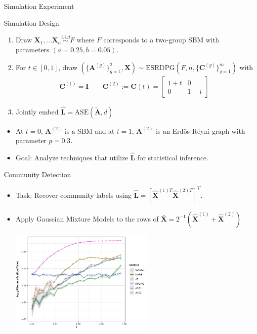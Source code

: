 \documentclass[handout]{beamer}
\newcommand{\bvar}[1]{\mathbf{#1}}
\begin{document}
\begin{frame}{Simulation Experiment}

    \begin{block}{Simulation Design}
        \begin{enumerate}
            \item Draw $\bvar{X}_1, \ldots \bvar{X}_n \overset{i.i.d}{\sim} F$ where $F$ corresponds to a two-group SBM with parameters $(a = 0.25, b = 0.05)$. 
            \item For $t\in[0,1]$, draw $(\{\bvar{A}^{(g)}\}_{g=1}^2, \bvar{X})\sim \text{ESRDPG}(F, n, \{\bvar{C}^{(g)}\}_{g=1}^m)$ with 
               \begin{align*}
                    \bvar{C}^{(1)} = \bvar{I} \quad \quad \bvar{C}^{(2)} := \bvar{C}(t) = \begin{bmatrix} 1 + t & 0\\ 0 & 1 - t \end{bmatrix}
                \end{align*}
            \item Jointly embed $\hat{\bvar{L}} = \text{ASE}(\tilde{\bvar{A}}, d)$
        \end{enumerate}
    \end{block}
 \begin{itemize}
    \item At $t = 0$, $\bvar{A}^{(2)}$ is a SBM and at $t = 1$, $\bvar{A}^{(2)}$ is an Erd\"{o}s-R\'{e}yni graph with parameter $p = 0.3$.\pause
    \item Goal: Analyze techniques that utilize $\hat{\bvar{L}}$ for statistical inference. 
 \end{itemize}   
\end{frame}

\begin{frame}{Community Detection}
    \begin{itemize}
        \item Task: Recover community labels using $\hat{\bvar{L}} = [\hat{\bvar{X}}^{(1)T}\hat{\bvar{X}}^{(2)T}]^T$. 
        \item Apply Gaussian Mixture Models to the rows of $\bar{\bvar{X}} = 2^{-1}(\hat{\bvar{X}}^{(1)} + \hat{\bvar{X}}^{(2)})$\pause
    \end{itemize}

    \begin{center}
        \includegraphics[width = 3.25in, height = 2in]{multiple_methods_mc_comp.jpeg}
    \end{center}
\end{frame}
\end{document}
